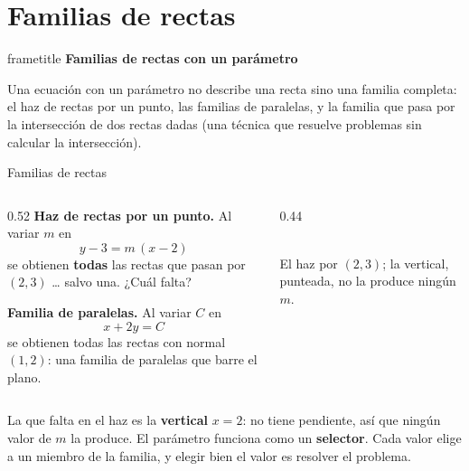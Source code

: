 \documentclass[aspectratio=169,10pt]{beamer}
\newcommand{\destaca}[1]{%
  \par\vspace{3pt}\noindent
  \colorbox{turquesaClaro}{%
    \parbox{\dimexpr\linewidth-2\fboxsep\relax}{\vspace{3pt}#1\vspace{3pt}}}%
  \par\vspace{3pt}}
\newcommand{\hojaSesion}[2]{%
  \vfill
  \begin{beamercolorbox}[wd=\textwidth,sep=16pt,center]{frametitle}
    {\Large\bfseries #1}\\[11pt]
    \begin{minipage}{0.82\textwidth}\centering\small #2\end{minipage}
  \end{beamercolorbox}
  \vfill}
\begin{document}
\section{Familias de rectas}
\begin{frame}[plain]
  \hojaSesion{Familias de rectas con un parámetro}{%
  Una ecuación con un parámetro no describe una recta sino una familia
  completa: el haz de rectas por un punto, las familias de paralelas,
  y la familia que pasa por la intersección de dos rectas dadas (una
  técnica que resuelve problemas sin calcular la intersección).}
\end{frame}
\begin{frame}{Familias de rectas}
  \begin{columns}[T]
    \begin{column}{0.52\textwidth}
      \textbf{Haz de rectas por un punto.} Al variar $m$ en
      \[
        y-3=m\,(x-2)
      \]
      se obtienen \textbf{todas} las rectas que pasan por $(2,3)$
      \ldots{} salvo una. ¿Cuál falta?

      \vspace{0.2cm}

      \textbf{Familia de paralelas.} Al variar $C$ en
      \[
        x+2y=C
      \]
      se obtienen todas las rectas con normal $(1,2)$: una familia de
      paralelas que barre el plano.
    \end{column}
    \begin{column}{0.44\textwidth}
      \begin{center}
      \\[2pt]
      {\scriptsize El haz por $(2,3)$; la vertical, punteada,
      no la produce ningún $m$.}
      \end{center}
    \end{column}
  \end{columns}

  \vspace{0.1cm}
  \destaca{La que falta en el haz es la \textbf{vertical} $x=2$: no
  tiene pendiente, así que ningún valor de $m$ la produce. El
  parámetro funciona como un \textbf{selector}. Cada valor elige a un
  miembro de la familia, y elegir bien el valor es resolver el
  problema.}
\end{frame}
\end{document}
